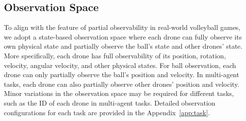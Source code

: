 
\subsection{Observation Space}

To align with the feature of partial observability in real-world volleyball games, we adopt a state-based observation space where each drone can fully observe its own physical state and partially observe the ball's state and other drones' state. 
More specifically, each drone has full observability of its position, rotation, velocity, angular velocity, and other physical states. For ball observation, each drone can only partially observe the ball's position and velocity. In multi-agent tasks, each drone can also partially observe other drones' position and velocity. Minor variations in the observation space may be required for different tasks, such as the ID of each drone in multi-agent tasks. Detailed observation configurations for each task are provided in the Appendix~\ref{app:task}.


